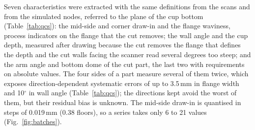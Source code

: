 \documentclass[pdflatex,sn-basic,lineno]{sn-jnl}
\begin{document}
Seven characteristics were extracted with the same definitions from the scans and from the simulated nodes, referred to the plane of the cup bottom (Table~\ref{tab:qcs}): the mid-side and corner draw-in and the flange waviness, process indicators on the flange that the cut removes; the wall angle and the cup depth, measured after drawing because the cut removes the flange that defines the depth and the cut walls facing the scanner read several degrees too steep; and the arm angle and bottom dome of the cut part, the last two with requirements on absolute values. The four sides of a part measure several of them twice, which exposes direction-dependent systematic errors of up to 3.5\,mm in flange width and 10$^\circ$ in wall angle (Table~\ref{tab:qcs}); the directions kept avoid the worst of them, but their residual bias is unknown. The mid-side draw-in is quantised in steps of 0.019\,mm (0.38 floors), so a series takes only 6 to 21 values (Fig.~\ref{fig:batches}).
\end{document}
